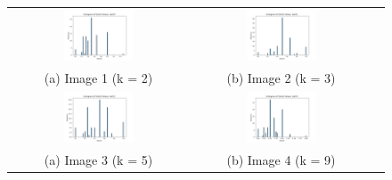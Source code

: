 \documentclass{article}
\begin{document}
\begin{enumerate}
    \begin{figure}[H]
        \centering
        \begin{tabular}{ccc}
            \includegraphics[width=0.4\textwidth]{img/test30.png} &
            \includegraphics[width=0.4\textwidth]{img/test31.png} \\
            (a) Image 1 (k = 2) & (b) Image 2 (k = 3)\\
            \includegraphics[width=0.4\textwidth]{img/test32.png} &
            \includegraphics[width=0.4\textwidth]{img/test33.png} \\
            (a) Image 3 (k = 5) & (b) Image 4 (k = 9)\\
        \end{tabular}
        \label{fig:4_images}
    \end{figure}


\end{enumerate}
\end{document}
